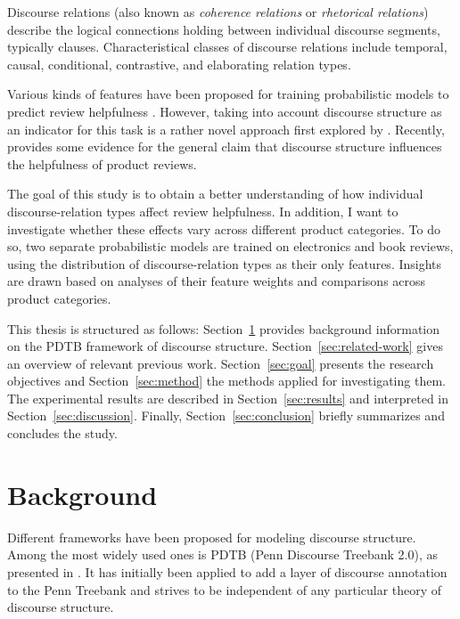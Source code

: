 \documentclass[
    a4paper,%
    12pt,%
    oneside,%
    toc=bibliography,
    final,
]{scrartcl}
\begin{document}
Discourse relations (also known as \textit{coherence relations} or \textit{rhetorical relations}) describe the logical connections holding between individual discourse segments, typically clauses. Characteristical classes of discourse relations include temporal, causal, conditional, contrastive, and elaborating relation types.

Various kinds of features have been proposed for training probabilistic models to predict review helpfulness \citep[see][50ff.]{Almagrabi2015}. However, taking into account discourse structure as an indicator for this task is a rather novel approach first explored by \citet{Mertz2014}. Recently, \citet{Golly2017} provides some evidence for the general claim that discourse structure influences the helpfulness of product reviews.

The goal of this study is to obtain a better understanding of how individual discourse-relation types affect review helpfulness. In addition, I want to investigate whether these effects vary across different product categories. To do so, two separate probabilistic models are trained on electronics and book reviews, using the distribution of discourse-relation types as their only features. Insights are drawn based on analyses of their feature weights and comparisons across product categories.

This thesis is structured as follows: Section~\ref{sec:background} provides background information on the PDTB framework of discourse structure. Section~\ref{sec:related-work} gives an overview of relevant previous work. Section~\ref{sec:goal} presents the research objectives and Section~\ref{sec:method} the methods applied for investigating them. The experimental results are described in Section~\ref{sec:results} and interpreted in Section~\ref{sec:discussion}. Finally, Section~\ref{sec:conclusion} briefly summarizes and concludes the study.


\section{Background}
\label{sec:background}

Different frameworks have been proposed for modeling discourse structure. Among the most widely used ones is PDTB (Penn Discourse Treebank 2.0), as presented in \citet{Prasad2008}. It has initially been applied to add a layer of discourse annotation to the Penn Treebank \citep{Marcus1993} and strives to be independent of any particular theory of discourse structure.
\end{document}
